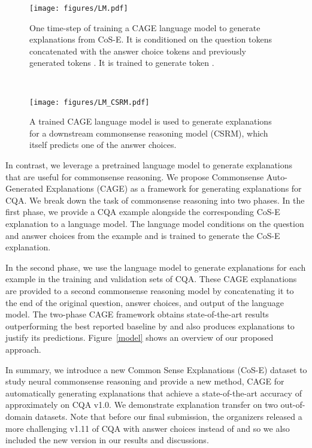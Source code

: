 \documentclass[11pt,a4paper]{article}
\begin{document}
 \begin{figure*}[t!]
    \centering
    \begin{subfigure}[t]{0.49\textwidth}
        \centering
        \texttt{[image: figures/LM.pdf]}
        \caption{One time-step of training a CAGE language model to generate explanations from CoS-E. It is conditioned on the question tokens  concatenated with the answer choice tokens  and previously generated tokens . It is trained to generate token .}
    \end{subfigure}~ 
    \begin{subfigure}[t]{0.49\textwidth}
        \centering
        \texttt{[image: figures/LM\_CSRM.pdf]}
        \caption{A trained CAGE language model is used to generate explanations for a downstream commonsense reasoning model (CSRM), which itself predicts one of the answer choices.}
    \end{subfigure}
    \caption{An overview of CAGE trained on CoS-E and CQA.}\label{model}
    \vspace{-0.5cm}
\end{figure*}
In contrast, we leverage a pretrained language model to generate explanations that are useful for commonsense reasoning. 
We propose Commonsense Auto-Generated Explanations (CAGE) as a framework for generating explanations for CQA.
We break down the task of commonsense reasoning into two phases.
In the first phase, we provide a CQA example alongside the corresponding CoS-E explanation to a language model.
The language model conditions on the question and answer choices from the example and is trained to generate the CoS-E explanation.

In the second phase,
we use the language model to generate explanations for each example in the training and validation sets of CQA. 
These CAGE explanations are provided to a second commonsense reasoning model by concatenating it to the end of the original question, answer choices, and output of the language model. The two-phase CAGE framework obtains state-of-the-art results outperforming the best reported baseline by  and also produces explanations to justify its predictions. Figure~\ref{model} shows an overview of our proposed approach. 

In summary, we introduce a new Common Sense Explanations (CoS-E) dataset to study neural commonsense reasoning and provide a new method, CAGE for automatically generating explanations that achieve a state-of-the-art accuracy of approximately  on CQA v1.0. We demonstrate explanation transfer on two out-of-domain datasets. Note that before our final submission, the organizers released a more challenging v1.11 of CQA with  answer choices instead of  and so we also included the new version in our results and discussions.
\end{document}
